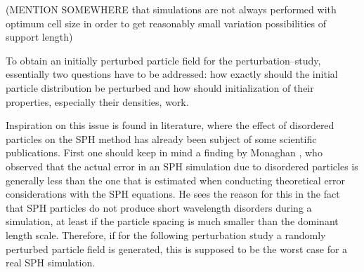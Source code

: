 \documentclass{report}
\begin{document}
(MENTION SOMEWHERE that simulations are not always performed with optimum cell size in order to get reasonably small variation possibilities of support length)
\linebreak[2]                                                                                                                                                                                                                                                                  
                                                                                                                                              
 To obtain an initially perturbed particle field for the perturbation--study, essentially two questions have to be addressed: how exactly should the initial particle distribution be perturbed and how should initialization of their properties, especially their densities, work.         
                                                                                                                                              
 Inspiration on this issue is found in literature, where the effect of disordered particles on the SPH method has already been subject of some scientific publications.                                                                                                                      
 First one should keep in mind a finding by Monaghan \cite{Monaghan2005}, who observed that the actual error in an SPH simulation due to disordered particles is generally less than the one that is estimated when conducting theoretical error considerations with the SPH equations. He sees the reason for this in the fact that SPH particles do not produce short wavelength disorders during a simulation, at least if the particle spacing is much smaller than the dominant length scale. Therefore, if for the following perturbation study a randomly perturbed particle field is generated, this is supposed to be the worst case for a real SPH simulation.                                                                  
                                                                                                                                              
\end{document}
